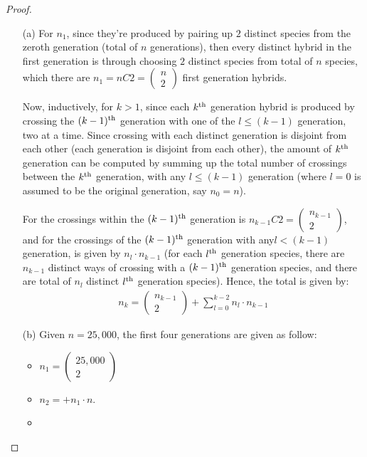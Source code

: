\documentclass{article}
\begin{document}
\begin{proof}
    
    \hfil

    \begin{itemize}
        \item[(a)] For $n_1$, since they're produced by pairing up $2$ distinct species from the zeroth generation (total of $n$ generations), then every distinct hybrid in the first generation is through choosing $2$ distinct species from total of $n$ species, which there are $n_1 = nC2 = \begin{pmatrix}n\\2\end{pmatrix}$ first generation hybrids.
        
        Now, inductively, for $k>1$, since each $k^\textmd{th}$ generation hybrid is produced by crossing the $(k-1)^\textmd{th}$ generation with one of the $l\leq (k-1)$ generation, two at a time. Since crossing with each distinct generation is disjoint from each other (each generation is disjoint from each other), the amount of $k^\textmd{th}$ generation can be computed by summing up the total number of crossings between the $k^\textmd{th}$ generation, with any $l\leq (k-1)$ generation (where $l=0$ is assumed to be the original generation, say $n_0=n$).

        For the crossings within the $(k-1)^\textmd{th}$ generation is $n_{k-1}C2 = \begin{pmatrix}n_{k-1}\\2\end{pmatrix}$, and for the crossings of the $(k-1)^\textmd{th}$ generation with any$l<(k-1)$ generation, is given by $n_l\cdot n_{k-1}$ (for each $l^\textmd{th}$ generation species, there are $n_{k-1}$ distinct ways of crossing with a $(k-1)^\textmd{th}$ generation species, and there are total of $n_l$ distinct $l^\textmd{th}$ generation species). Hence, the total is given by:
        \begin{align}
            n_k=\begin{pmatrix}n_{k-1}\\2\end{pmatrix} + \sum_{l=0}^{k-2}n_l\cdot n_{k-1}
        \end{align}
        \item[(b)] Given $n=25,000$, the first four generations are given as follow:
        \begin{itemize}
            \item $n_1=\begin{pmatrix}25,000\\2\end{pmatrix}$
            \item $n_2= + n_1 \cdot n$.
            \item 
        \end{itemize}
    \end{itemize}
\end{proof}
\end{document}
